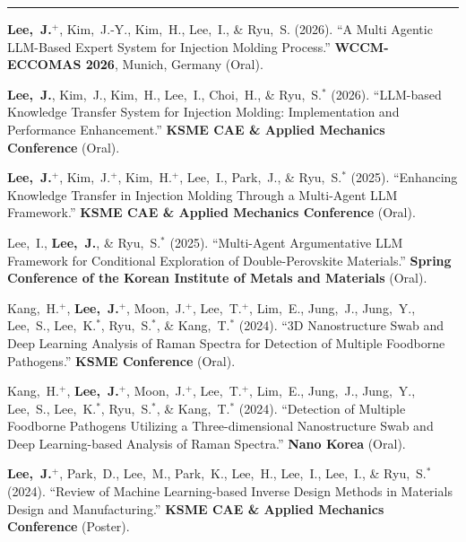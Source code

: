 \documentclass[11pt, a4paper]{article}
\newenvironment{cvsec}[1]{%
  \par\vspace{0.9em}%
  \noindent{\large\bfseries #1}\par\nobreak%
  \vspace{2pt}%
  \noindent\rule{\linewidth}{0.4pt}\par\nobreak%
  \vspace{3pt}%
  \noindent%
}{%
  \vspace{2pt}%
}
\newenvironment{pubrev}[1]{%
  \begin{etaremune}[leftmargin=2em, itemsep=5pt, parsep=0pt, topsep=0pt, partopsep=0pt, start=#1]%
}{%
  \end{etaremune}%
}
\begin{document}
\begin{cvsec}{Conferences}

\begin{pubrev}{13}

\item \textbf{Lee,~J.}$^+$, Kim,~J.-Y., Kim,~H., Lee,~I., \& Ryu,~S. (2026).
``A Multi Agentic LLM-Based Expert System for Injection Molding Process.''
\textbf{WCCM-ECCOMAS 2026}, Munich, Germany (Oral).

\item \textbf{Lee,~J.}, Kim,~J., Kim,~H., Lee,~I., Choi,~H., \& Ryu,~S.$^*$ (2026).
``LLM-based Knowledge Transfer System for Injection Molding: Implementation and Performance Enhancement.''
\textbf{KSME CAE \& Applied Mechanics Conference} (Oral).

\item \textbf{Lee,~J.}$^+$, Kim,~J.$^+$, Kim,~H.$^+$, Lee,~I., Park,~J., \& Ryu,~S.$^*$ (2025).
``Enhancing Knowledge Transfer in Injection Molding Through a Multi-Agent LLM Framework.''
\textbf{KSME CAE \& Applied Mechanics Conference} (Oral).

\item Lee,~I., \textbf{Lee,~J.}, \& Ryu,~S.$^*$ (2025).
``Multi-Agent Argumentative LLM Framework for Conditional Exploration of Double-Perovskite Materials.''
\textbf{Spring Conference of the Korean Institute of Metals and Materials} (Oral).

\item Kang,~H.$^+$, \textbf{Lee,~J.}$^+$, Moon,~J.$^+$, Lee,~T.$^+$, Lim,~E., Jung,~J., Jung,~Y., Lee,~S., Lee,~K.$^*$, Ryu,~S.$^*$, \& Kang,~T.$^*$ (2024).
``3D Nanostructure Swab and Deep Learning Analysis of Raman Spectra for Detection of Multiple Foodborne Pathogens.''
\textbf{KSME Conference} (Oral).

\item Kang,~H.$^+$, \textbf{Lee,~J.}$^+$, Moon,~J.$^+$, Lee,~T.$^+$, Lim,~E., Jung,~J., Jung,~Y., Lee,~S., Lee,~K.$^*$, Ryu,~S.$^*$, \& Kang,~T.$^*$ (2024).
``Detection of Multiple Foodborne Pathogens Utilizing a Three-dimensional Nanostructure Swab and Deep Learning-based Analysis of Raman Spectra.''
\textbf{Nano Korea} (Oral).

\item \textbf{Lee,~J.}$^+$, Park,~D., Lee,~M., Park,~K., Lee,~H., Lee,~I., Lee,~I., \& Ryu,~S.$^*$ (2024).
``Review of Machine Learning-based Inverse Design Methods in Materials Design and Manufacturing.''
\textbf{KSME CAE \& Applied Mechanics Conference} (Poster).


\end{pubrev}
\end{cvsec}
\end{document}
